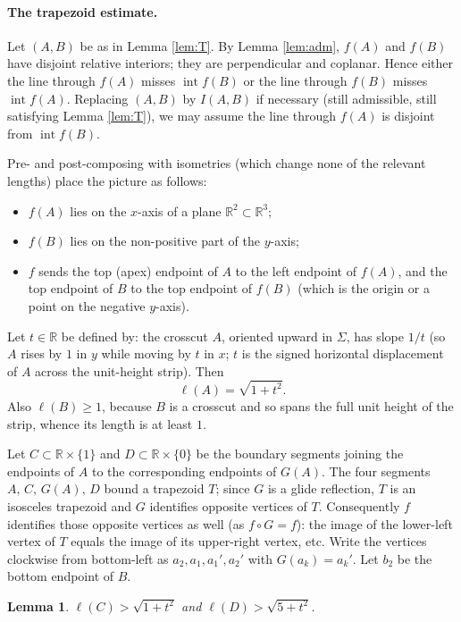 \documentclass[12pt]{article}
\newtheorem{lemma}[theorem]{Lemma}
\newcommand{\R}{\mathbb{R}}
\newcommand{\Sig}{\Sigma}
\DeclareMathOperator{\interior}{int}
\begin{document}
\paragraph{The trapezoid estimate.}
Let $(A,B)$ be as in Lemma \ref{lem:T}. By Lemma \ref{lem:adm}, $f(A)$
and $f(B)$ have disjoint relative interiors; they are perpendicular and
coplanar. Hence either the line through $f(A)$ misses $\interior f(B)$ or
the line through $f(B)$ misses $\interior f(A)$. Replacing $(A,B)$ by
$I(A,B)$ if necessary (still admissible, still satisfying Lemma
\ref{lem:T}), we may assume the line through $f(A)$ is disjoint from
$\interior f(B)$.

Pre- and post-composing with isometries (which change none of the
relevant lengths) place the picture as follows:
\begin{itemize}
\item $f(A)$ lies on the $x$-axis of a plane $\R^2\subset\R^3$;
\item $f(B)$ lies on the non-positive part of the $y$-axis;
\item $f$ sends the top (apex) endpoint of $A$ to the left endpoint of
$f(A)$, and the top endpoint of $B$ to the top endpoint of $f(B)$ (which
is the origin or a point on the negative $y$-axis).
\end{itemize}
Let $t\in\R$ be defined by: the crosscut $A$, oriented upward in $\Sig$,
has slope $1/t$ (so $A$ rises by $1$ in $y$ while moving by $t$ in $x$;
$t$ is the signed horizontal displacement of $A$ across the unit-height
strip). Then
\[
\ell(A)=\sqrt{1+t^2}.
\]
Also $\ell(B)\ge1$, because $B$ is a crosscut and so spans the full unit
height of the strip, whence its length is at least $1$.

Let $C\subset\R\times\{1\}$ and $D\subset\R\times\{0\}$ be the boundary
segments joining the endpoints of $A$ to the corresponding endpoints of
$G(A)$. The four segments $A,\,C,\,G(A),\,D$ bound a trapezoid $T$; since
$G$ is a glide reflection, $T$ is an isosceles trapezoid and $G$
identifies opposite vertices of $T$. Consequently $f$ identifies those
opposite vertices as well (as $f\circ G=f$): the image of the lower-left
vertex of $T$ equals the image of its upper-right vertex, etc. Write the
vertices clockwise from bottom-left as $a_2,a_1,a_1',a_2'$ with
$G(a_k)=a_k'$. Let $b_2$ be the bottom endpoint of $B$.

\begin{lemma}\label{lem:bound}
$\ell(C)>\sqrt{1+t^2}$ and $\ell(D)>\sqrt{5+t^2}$.
\end{lemma}
\end{document}
